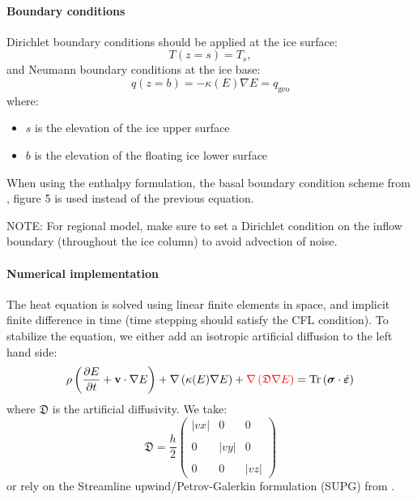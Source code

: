 \paragraph{Boundary conditions}
Dirichlet boundary conditions should be applied at the ice surface:
\begin{equation}
	T(z=s) = T_s,
\end{equation}
and Neumann boundary conditions at the ice base:
\begin{equation}
	q(z=b) = - \kappa(E) \nabla E = q_{\mbox{geo}}
\end{equation}
where:
\begin{itemize}
	\item $s$ is the elevation of the ice upper surface
	\item $b$ is the elevation of the floating ice lower surface
\end{itemize}
When using the enthalpy formulation, the basal boundary condition scheme from \cite{Aschwanden2012}, figure 5 is used instead of the previous equation.

NOTE: For regional model, make sure to set a Dirichlet condition on the inflow boundary (throughout the ice column) to avoid advection of noise.

\paragraph{Numerical implementation}
The heat equation is solved using linear finite elements in space, and implicit finite difference in time (time stepping should satisfy the CFL condition). To stabilize the equation, we either add an isotropic artificial diffusion to the left hand side:
\begin{equation}
	\rho \left(\frac{\partial E}{\partial t} + {\bf v} \cdot \nabla E \right)
	+ \nabla \left(\kappa(E)  \nabla E \right) + {\color{red} \nabla \left(\mathfrak{D} \nabla E\right)}
	= \mbox{Tr} \left( \boldsymbol{\sigma} \cdot \dot{\boldsymbol{\varepsilon}}\right)
\end{equation}
where $\mathfrak{D}$ is the artificial diffusivity. We take:
\begin{equation}
	\mathfrak{D} = \frac{h}{2}
	\left(\begin{array}{ccc}
		\left|vx\right| & 0 & 0\\
		\\
		0 & \left|vy\right| & 0 \\
		\\
		0 & 0 & \left|vz\right|
	\end{array}\right)
\end{equation}
or rely on the Streamline upwind/Petrov-Galerkin formulation (SUPG) from \cite{Franca2006}.

